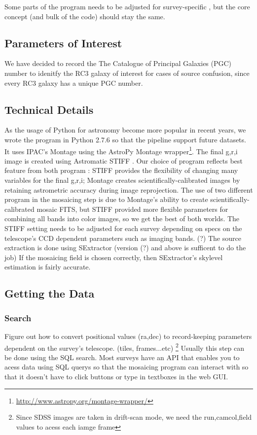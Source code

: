 \documentclass[5p]{elsarticle}
\begin{document}
	Some parts of the program needs to be adjusted for survey-specific , but the core concept (and bulk of the code) should stay the same. 
		\subsection{Parameters of Interest }
	We have decided to record the The Catalogue of Principal Galaxies (PGC) number to idenitfy the RC3 galaxy of interest for cases of source confusion, since every RC3 galaxy has a unique PGC number. 

		\subsection{Technical Details}
		As the usage of Python for astronomy become more popular in recent years, we wrote the program in Python 2.7.6 so that the pipeline support future datasets.	 It uses IPAC's Montage  \cite{montage} using the AstroPy Montage wrapper\footnote{\url{http://www.astropy.org/montage-wrapper/}}.  The final g,r,i image is created using Astromatic STIFF \cite{stiff} . Our choice of program reflects best feature from both program : STIFF provides the flexibility of changing many variables for the final g,r,i; Montage creates scientifically-calibrated images by retaining astrometric accuracy during image reprojection. The use of two different program in the mosaicing step is due to Montage's ability to create scientifically-calibrated mosaic FITS, but STIFF provided more flexible parameters for combining all bands into color images, so we get the best of both worlds. The STIFF setting needs to be adjusted for each survey depending on specs on the telescope's CCD dependent parameters such as imaging bands. (?) The source extraction is done using SExtractor (version (?) and above is sufficent to do the job) If the mosaicing field is chosen correctly, then SExtractor's skylevel estimation is fairly accurate. 
	\subsection{Getting the Data}
		\subsubsection{Search}
			Figure out how to convert positional values (ra,dec) to record-keeping parameters dependent on the survey's telescope. (tiles, frames...etc) \footnote{Since SDSS images are taken in drift-scan mode, we need the run,camcol,field values to acess each iamge frame} Usually this step can be done using the SQL search. 
Most surveys have an API that enables you to acess data using SQL querys so that the mosaicing program can interact with so that it doesn't have to  click buttons or type in textboxes in the web GUI. 
\end{document}
